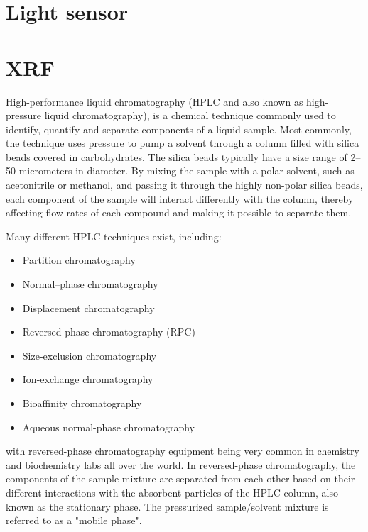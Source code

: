 \section{Light sensor}



\section{XRF}

\label{sec:hplc}
High-performance liquid chromatography (HPLC and also known as high-pressure liquid chromatography), is a chemical technique commonly used to identify, quantify and separate components of a liquid sample. Most commonly, the technique uses pressure to pump a solvent through a column filled with silica beads covered in carbohydrates. The silica beads typically have a size range of 2–50 micrometers in diameter. By mixing the sample with a polar solvent, such as acetonitrile or methanol, and passing it through the highly non-polar silica beads, each component of the sample will interact differently with the column, thereby affecting flow rates of each compound and making it possible to separate them. \cite{wiki_hplc}

Many different HPLC techniques exist, including:
\begin{itemize}
    \item Partition chromatography
    \item Normal–phase chromatography
    \item Displacement chromatography
    \item Reversed-phase chromatography (RPC)
    \item Size-exclusion chromatography
    \item Ion-exchange chromatography
    \item Bioaffinity chromatography
    \item Aqueous normal-phase chromatography
\end{itemize}
with reversed-phase chromatography equipment being very common in chemistry and biochemistry labs all over the world. In reversed-phase chromatography, the components of the sample mixture are separated from each other based on their different interactions with the absorbent particles of the HPLC column, also known as the stationary phase. The pressurized sample/solvent mixture is referred to as a "mobile phase".

